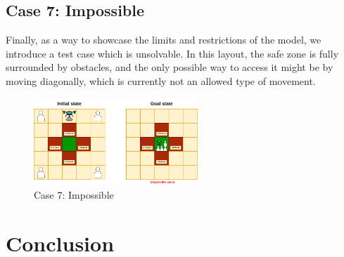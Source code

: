 \documentclass{article}
\begin{document}
\FloatBarrier

\subsection{Case 7: Impossible}

Finally, as a way to showcase the limits and restrictions of the model, we introduce a test case which is unsolvable. In this layout, the safe zone is fully surrounded by obstacles, and the only possible way to access it might be by moving diagonally, which is currently not an allowed type of movement.

\begin{figure}[ht]
    \centering
    \includegraphics[width=0.55\textwidth]{assets/problem-7-impossible.drawio.png} %
    \caption{Case 7: Impossible}
    \label{fig:initial-state-impossible}
\end{figure}
\FloatBarrier

\section{Conclusion}
\end{document}
